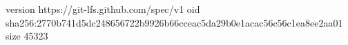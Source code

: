 version https://git-lfs.github.com/spec/v1
oid sha256:2770b741d5dc248656722b9926b66cceac5da29b0e1acac56c56c1ea8ee2aa01
size 45323
